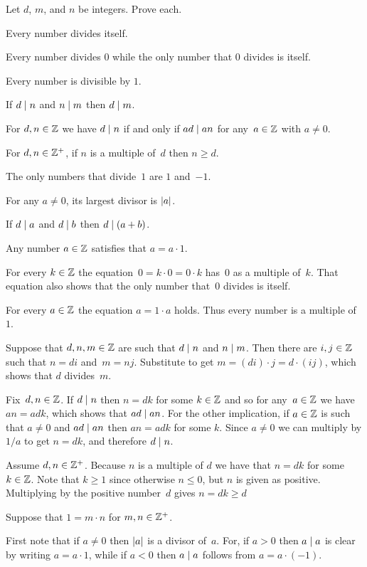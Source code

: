 \documentclass{ibl}
\begin{document}
\begin{ex}
Let $d$, $m$, and $n$ be integers.
Prove each.
\begin{exes}
\item {} Every number divides itself.
\item Every number divides $0$ while
  the only number that $0$ divides is itself.
\item Every number is divisible by $1$.
\item {} If $d\mid n$ and $n\mid m$ 
   then $d\mid m$.
\item {} 
  For $d,n\in\mathbb{Z}$ we have $d\mid n$ if and only if 
  $ad\mid an$ for any~$a\in\mathbb{Z}$ with $a\neq 0$.
\item {} 
  For $d,n\in\mathbb{Z}^+$, if $n$ is a multiple of~$d$ then $n\geq d$.
\item The only numbers that divide~$1$ are $1$ and~$-1$.
\item For any $a\neq 0$, its largest divisor is $\lvert a\rvert$.
\item If $d\mid a$ and $d\mid b$ then $d\mid (a+b)$.  
\end{exes}
\begin{ans}
\begin{exes}
\item Any number $a\in\mathbb{Z}$ satisfies that $a=a\cdot 1$.
\item For every $k\in\mathbb{Z}$ the equation~$0=k\cdot 0=0\cdot k$ has~$0$ 
  as a multiple of~$k$.
  That equation also shows that the only number that~$0$ divides is itself. 
\item For every $a\in\mathbb{Z}$ the equation $a=1\cdot a$ holds.
   Thus every number is a multiple of~$1$.
\item Suppose that $d, n, m\in\mathbb{Z}$ are such that $d\mid n$ and
  $n\mid m$.
  Then there are $i,j\in\mathbb{Z}$ such that $n=di$ and~$m=nj$.
  Substitute to get $m=(di)\cdot j=d\cdot(ij)$, which shows that
  $d$ divides~$m$.
\item Fix~$d,n\in\mathbb{Z}$.
  If $d\mid n$ then $n=dk$ for some $k\in\mathbb{Z}$ and so for any~$a\in\mathbb{Z}$
  we have $an=adk$, which shows that $ad\mid an$.
  For the other implication, if $a\in\mathbb{Z}$ is such that $a\neq 0$ and
  $ad\mid an$ then $an=adk$ for some  $k$.
  Since $a\neq 0$ we can multiply by $1/a$ to get $n=dk$, and therefore
  $d\mid n$.
\item Assume $d,n\in\mathbb{Z}^+$.
  Because $n$ is a multiple of $d$ we have that $n=dk$ for some $k\in\mathbb{Z}$.
  Note that $k\geq 1$ since otherwise $n\leq 0$, but $n$ is given as positive.  
  Multiplying by the positive number~$d$ gives $n=dk\geq d$ 
\item Suppose that $1=m\cdot n$ for $m,n\in\mathbb{Z}^+$. 
\item First note that if $a\neq 0$ then $\lvert a\rvert$ is a divisor of~$a$.
  For, if $a>0$ then $a\mid a$ is clear by writing $a=a\cdot 1$,
  while if $a<0$ then $a\mid a$ follows from $a=a\cdot(-1)$.
\end{exes}
\end{ans}
\end{ex}
\end{document}
